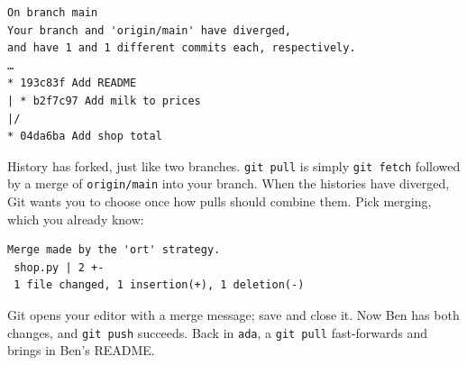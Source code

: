 \begin{codeblock}

\begin{Shaded}
\begin{Highlighting}[]
  
\end{Highlighting}
\end{Shaded}

\end{codeblock}

\begin{codeblock}
\begin{Verbatim}[formatcom=\outputstyle]
On branch main
Your branch and 'origin/main' have diverged,
and have 1 and 1 different commits each, respectively.
…
* 193c83f Add README
| * b2f7c97 Add milk to prices
|/  
* 04da6ba Add shop total
\end{Verbatim}
\end{codeblock}

History has forked, just like two branches. \texttt{git\ pull} is simply \texttt{git\ fetch} followed by a merge of \texttt{origin/main} into your branch. When the histories have diverged, Git wants you to choose once how pulls should combine them. Pick merging, which you already know:

\begin{codeblock}

\begin{Shaded}
\begin{Highlighting}[]
\end{Highlighting}
\end{Shaded}

\end{codeblock}

\begin{codeblock}
\begin{Verbatim}[formatcom=\outputstyle]
Merge made by the 'ort' strategy.
 shop.py | 2 +-
 1 file changed, 1 insertion(+), 1 deletion(-)
\end{Verbatim}
\end{codeblock}

Git opens your editor with a merge message; save and close it. Now Ben has both changes, and \texttt{git\ push} succeeds. Back in \texttt{ada}, a \texttt{git\ pull} fast-forwards and brings in Ben's README.

